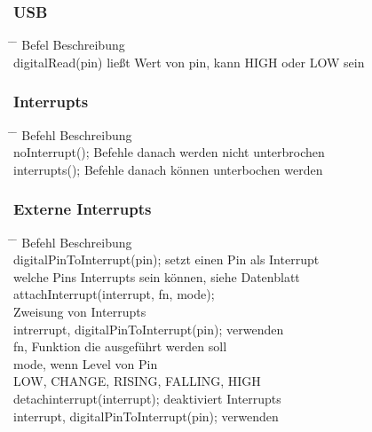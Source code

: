 \documentclass[10pt,a4paper,oneside]{article}
\begin{document}
\subsubsection{USB}
\begin{tabbing}
  \hspace*{1mm} \=\hspace{50mm} \= \kill
  \>Befel \>Beschreibung \\
  \>digitalRead(pin) \> ließt Wert von pin, kann HIGH oder LOW sein \\
\end{tabbing}


\subsubsection{Interrupts}
\begin{tabbing}
  \hspace*{1mm} \=\hspace{50mm} \= \kill
  \>Befehl \>Beschreibung \\
  \>noInterrupt(); \>Befehle danach werden nicht unterbrochen \\
  \>interrupts(); \>Befehle danach können unterbochen werden\\
\end{tabbing}


\subsubsection{Externe Interrupts}
\begin{tabbing}
  \hspace*{1mm} \=\hspace{50mm} \= \kill
  \>Befehl \>Beschreibung \\
  \>digitalPinToInterrupt(pin); \>setzt einen Pin als Interrupt\\ 
  \> \>welche Pins Interrupts sein können, siehe Datenblatt\\ 
  \>attachInterrupt(interrupt, fn, mode); \> \\ 
  \> \>Zweisung von Interrupts\\ 
  \> \>intrerrupt, digitalPinToInterrupt(pin); verwenden\\ 
  \> \>fn, Funktion die ausgeführt werden soll\\ 
  \> \>mode, wenn Level von Pin \\ 
  \> \>LOW, CHANGE, RISING, FALLING, HIGH\\
  \>detachinterrupt(interrupt); \> deaktiviert Interrupts\\ 
  \> \>interrupt, digitalPinToInterrupt(pin); verwenden\\
\end{tabbing}
\end{document}
